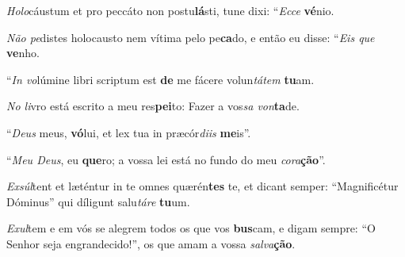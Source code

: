 \begin{greenumerate}
  \setcounter{enumi}{1}


  \item \textit{Holo}cáustum et pro peccáto non postu\textbf{lá}sti, {\GreStar} tune dixi: ``\textit{Ecce} \textbf{vé}nio. 

  \switchcolumn\setcounter{enumi}{1}

  \item \textit{Não pe}distes holocausto nem vítima pelo pe\textbf{ca}do, {\GreStar} e então eu disse: ``\textit{Eis que} \textbf{ve}nho. 

  \switchcolumn*


  \item ``\textit{In vo}lúmine libri scriptum est \textbf{de} me {\GreStar} fácere volun\textit{tátem} \textbf{tu}am. 

  \switchcolumn%

  \item \textit{No li}vro está escrito a meu res\textbf{pei}to: {\GreStar} Fazer a vos\textit{sa von}\textbf{ta}de. 

  \switchcolumn*


  \item ``\textit{Deus} meus, \textbf{vó}lui, {\GreStar} et lex tua in præcór\textit{diis} \textbf{me}is''. 

  \switchcolumn%

  \item ``\textit{Meu Deus}, eu \textbf{que}ro; {\GreStar} a vossa lei está no fundo do meu \textit{cora}\textbf{ção}''. 

  \switchcolumn*


  \item \textit{Exsúl}tent et læténtur in te omnes quærén\textbf{tes} te, {\GreStar} et dicant semper: ``Magnificétur Dóminus'' qui díligunt salu\textit{táre} \textbf{tu}um. 

  \switchcolumn%

  \item \textit{Exul}tem e em vós se alegrem todos os que vos \textbf{bus}cam, {\GreStar} e digam sempre: ``O Senhor seja engrandecido!'', os que amam a vossa \textit{salva}\textbf{ção}. 

\end{greenumerate}